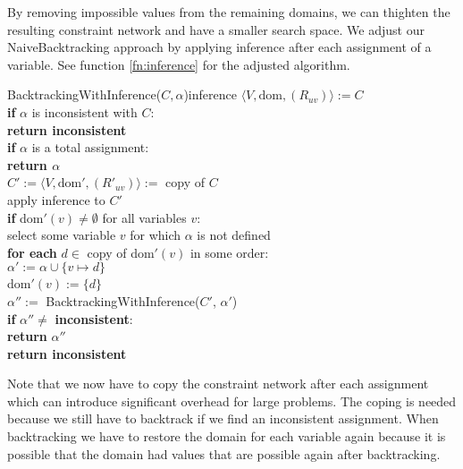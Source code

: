 By removing impossible values from the remaining domains, we can thighten the resulting constraint network and have a smaller search space. We adjust our NaiveBacktracking approach by applying inference after each assignment of a variable. See function \ref{fn:inference} for the adjusted algorithm.

\begin{function}{BacktrackingWithInference($C, \alpha$)}{inference}
	$\langle V, \text{dom}, (R_{uv})\rangle := C$ \\
	\textbf{if} $\alpha$ is inconsistent with $C$: \\
	\null \qquad\textbf{return inconsistent} \\

	\textbf{if} $\alpha$ is a total assignment: \\
	\null \qquad\textbf{return $\alpha$} \\

	$C' := \langle V, \text{dom}',(R'_{uv})\rangle :=$ copy of $C$ \\
	apply inference to $C'$ \\
	\textbf{if} dom$'(v) \neq \emptyset$ for all variables $v$: \\
	\null \qquad select some variable $v$ for which $\alpha$ is not defined \\
	\null \qquad \textbf{for each} $d \in$ copy of dom$'(v)$ in some order: \\
	\null \qquad \qquad $\alpha' := \alpha \cup \{v \mapsto d\}$ \\
	\null \qquad \qquad dom$'(v) := \{d\}$ \\
	\null \qquad \qquad $\alpha'' := $ BacktrackingWithInference($C'$, $\alpha'$) \\
	\null \qquad \qquad \textbf{if} $\alpha'' \neq$ \textbf{inconsistent}: \\
	\null \qquad \qquad \qquad \textbf{return} $\alpha''$ \\

	\textbf{return inconsistent}
\end{function}

Note that we now have to copy the constraint network after each assignment which can introduce significant overhead for large problems. The coping is needed because we still have to backtrack if we find an inconsistent assignment. When backtracking we have to restore the domain for each variable again because it is possible that the domain had values that are possible again after backtracking.

